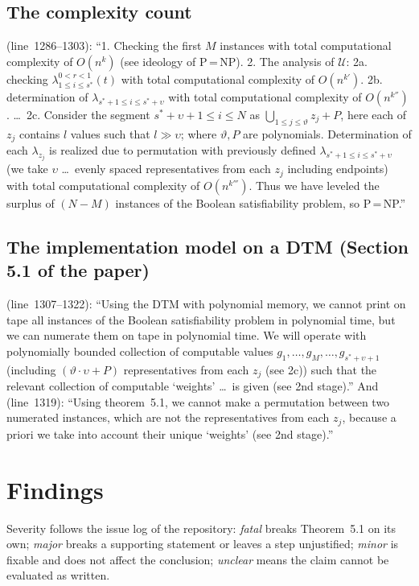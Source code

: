 \documentclass[11pt,a4paper]{article}
\newcommand{\paperline}[1]{(line~#1)}
\begin{document}
\subsection{The complexity count}

\paperline{1286--1303}: ``1. Checking the first $M$ instances with total computational complexity of $O(n^k)$ (see ideology of P\,=\,NP). 2. The analysis of $\mathcal U$: 2a. checking $\lambda^{0<r<1}_{1\le i\le s^*}(t)$ with total computational complexity of $O(n^{k'})$. 2b. determination of $\lambda_{s^*+1\le i\le s^*+\upsilon}$ with total computational complexity of $O(n^{k''})$. \ldots\ 2c. Consider the segment $s^*+\upsilon+1\le i\le N$ as $\bigcup_{1\le j\le\vartheta} z_j+P$, here each of $z_j$ contains $l$ values such that $l\gg\upsilon$; where $\vartheta,P$ are polynomials. Determination of each $\lambda_{z_j}$ is realized due to permutation with previously defined $\lambda_{s^*+1\le i\le s^*+\upsilon}$ (we take $\upsilon$ \ldots\ evenly spaced representatives from each $z_j$ including endpoints) with total computational complexity of $O(n^{k'''})$. Thus we have leveled the surplus of $(N-M)$ instances of the Boolean satisfiability problem, so P\,=\,NP.''

\subsection{The implementation model on a DTM (Section 5.1 of the paper)}

\paperline{1307--1322}: ``Using the DTM with polynomial memory, we cannot print on tape all instances of the Boolean satisfiability problem in polynomial time, but we can numerate them on tape in polynomial time. We will operate with polynomially bounded collection of computable values $g_1,\ldots,g_M,\ldots,g_{s^*+\upsilon+1}$ (including $(\vartheta\cdot\upsilon+P)$ representatives from each $z_j$ (see 2c)) such that the relevant collection of computable `weights' \ldots\ is given (see 2nd stage).'' And \paperline{1319}: ``Using theorem~5.1, we cannot make a permutation between two numerated instances, which are not the representatives from each $z_j$, because a priori we take into account their unique `weights' (see 2nd stage).''

\section{Findings}
\label{sec:findings}

Severity follows the issue log of the repository: \emph{fatal} breaks Theorem~5.1 on its own; \emph{major} breaks a supporting statement or leaves a step unjustified; \emph{minor} is fixable and does not affect the conclusion; \emph{unclear} means the claim cannot be evaluated as written.
\end{document}
